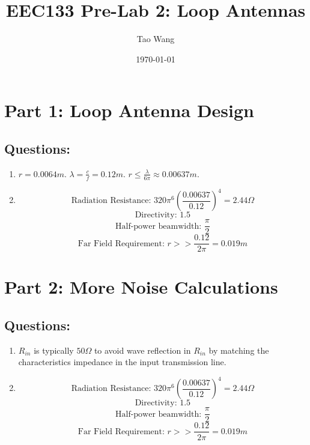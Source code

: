 \documentclass{article} %
\begin{document}
\title{EEC133 Pre-Lab 2: Loop Antennas}
\author{Tao Wang}
\date{\today}

\maketitle
\tableofcontents

\section*{Part 1: Loop Antenna Design}

\subsection*{Questions:}
\begin{enumerate}
    \item $r = 0.0064 \si{m}$. $\lambda = \frac{c}{f} = 0.12 \si{m}$. $r \leq \frac{\lambda}{6 \pi} \approx 0.00637 \si{m}$.
    \item
          \[\text{Radiation Resistance: }320 \pi^6 \left(\frac{0.00637}{0.12}\right)^4 = 2.44 \Omega \]
          \[\text{Directivity: } 1.5\]
          \[\text{Half-power beamwidth: } \frac{\pi}{2}\]
          \[\text{Far Field Requirement: } r >> \frac{0.12}{2\pi} = 0.019 \si{m}\]
\end{enumerate}

\section*{Part 2: More Noise Calculations}

\subsection*{Questions:}
\begin{enumerate}
    \item $R_{in}$ is typically $50 \Omega$ to avoid wave reflection in $R_{in}$ by matching the characteristics impedance in the input transmission line.
    \item
          \[\text{Radiation Resistance: }320 \pi^6 \left(\frac{0.00637}{0.12}\right)^4 = 2.44 \Omega \]
          \[\text{Directivity: } 1.5\]
          \[\text{Half-power beamwidth: } \frac{\pi}{2}\]
          \[\text{Far Field Requirement: } r >> \frac{0.12}{2\pi} = 0.019 \si{m}\]
\end{enumerate}
\end{document}
